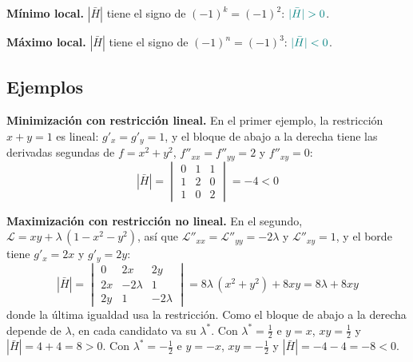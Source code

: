 \documentclass{article}
\begin{document}
\noindent\textbf{Mínimo local.} \(|\bar H|\) tiene el signo de \((-1)^k=(-1)^2\): \({\color{teal}|\bar H|>0}\).

\noindent\textbf{Máximo local.} \(|\bar H|\) tiene el signo de \((-1)^n=(-1)^3\): \({\color{teal}|\bar H|<0}\).

\subsection*{Ejemplos}

\noindent\textbf{Minimización con restricción lineal.} En el primer ejemplo, la restricción \(x+y=1\) es lineal: \(g'_x=g'_y=1\), y el bloque de abajo a la derecha tiene las derivadas segundas de \(f=x^2+y^2\), \(f''_{xx}=f''_{yy}=2\) y \(f''_{xy}=0\):
\[
|\bar H|
=
\begin{vmatrix}
0 & 1 & 1\\
1 & 2 & 0\\
1 & 0 & 2
\end{vmatrix}
=-4<0
\]

\medskip

\noindent\textbf{Maximización con restricción no lineal.} En el segundo, \(\mathcal L=xy+\lambda\,(1-x^2-y^2)\), así que \(\mathcal L''_{xx}=\mathcal L''_{yy}=-2\lambda\) y \(\mathcal L''_{xy}=1\), y el borde tiene \(g'_x=2x\) y \(g'_y=2y\):
\[
|\bar H|
=
\begin{vmatrix}
0 & 2x & 2y\\
2x & -2\lambda & 1\\
2y & 1 & -2\lambda
\end{vmatrix}
=8\lambda\,(x^2+y^2)+8xy=8\lambda+8xy
\]
donde la última igualdad usa la restricción. Como el bloque de abajo a la derecha depende de \(\lambda\), en cada candidato va su \(\lambda^*\). Con \(\lambda^*=\tfrac12\) e \(y=x\), \(xy=\tfrac12\) y \(|\bar H|=4+4=8>0\). Con \(\lambda^*=-\tfrac12\) e \(y=-x\), \(xy=-\tfrac12\) y \(|\bar H|=-4-4=-8<0\).


\medskip
\end{document}
